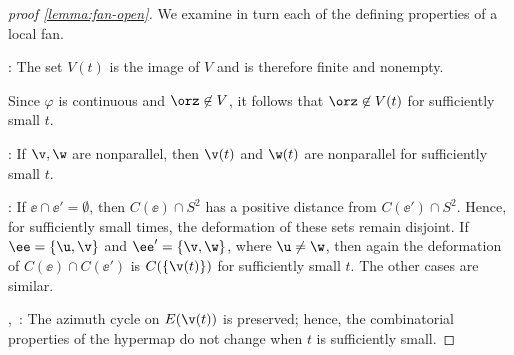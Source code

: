 \begin{proof}[proof \eqref{lemma:fan-open}] 
We examine in turn each of the defining properties of a local fan.

: The set $V(t)$ is the image of $V$ and is
therefore finite and nonempty.

 Since $\varphi$ is continuous and
$\orz\not\in V$, it follows that $\orz\not\in V(t)$ for sufficiently
small $t$.

: If $\v,\w$ are nonparallel, then $\v(t)$ and
$\w(t)$ are nonparallel for sufficiently small $t$.

: If $\ee \cap \ee'=\emptyset$, then $C(\ee)\cap
S^2$ has a positive distance from $C(\ee')\cap S^2$.  Hence, for
sufficiently small times, the deformation of these sets remain
disjoint.  If $\ee=\{\u,\v\}$ and $\ee'=\{\v,\w\}$, where $\u\ne\w$,
then again the deformation of $C(\ee)\cap C(\ee')$ is
$C(\{\v(t)\})$ for sufficiently small $t$.  The other cases are
similar.

,~: The azimuth cycle on $E(\v(t))$
is preserved; hence, the combinatorial properties of the hypermap do
not change when $t$ is sufficiently small.
\end{proof}

